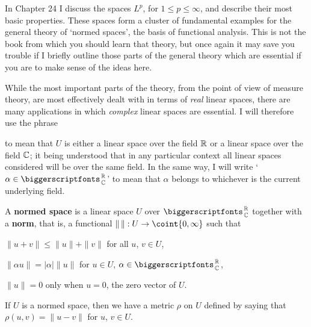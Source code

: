  
\def\chaptername{Appendix} 
\def\sectionname{Normed spaces} 
 
 
In Chapter 24 I discuss the spaces $L^p$, for 
$1\le p\le\infty$, and describe their most basic properties.   These 
spaces form a cluster of fundamental examples for the general theory of 
`normed spaces', the basis of functional analysis.   This is not the 
book from which you should learn that theory, but once again it may save 
you trouble if I briefly outline those parts of the general theory which 
are essential if you are to make sense of the ideas here. 
 
 While the most important 
parts of the theory, from the point 
of view of measure theory, are most effectively dealt with in terms of 
{\it real} linear spaces, there are many applications in which {\it 
complex} 
linear spaces are essential.   I will therefore use the phrase 
 
 
\noindent to mean that $U$ is either a linear space over the field 
$\Bbb R$ or a linear space over the field $\Bbb C$;   it being 
understood that 
in any particular context all linear spaces considered will be 
over the same field.   In the same way, I will write 
`$\alpha\in\RoverC$' to mean that $\alpha$ belongs to whichever is the 
current underlying field. 
 
 A {\bf normed space} is a linear space 
$U$ over $\RoverC$ together with a {\bf norm}, that is, a functional 
$\|\,\|:U\to\coint{0,\infty}$ such that 
 
\qquad $\|u+v\|\le\|u\|+\|v\|$ for all $u$, $v\in U$, 
 
\qquad $\|\alpha u\|=|\alpha|\|u\|$ for $u\in U$, $\alpha\in\RoverC$, 
 
\qquad $\|u\|=0$ only when $u=0$, the zero vector of $U$. 
 
 
 If $U$ is a normed space, then we have a metric 
$\rho$ on $U$ defined by saying that $\rho(u,v)=\|u-v\|$ for $u$, 
$v\in U$.    
 
